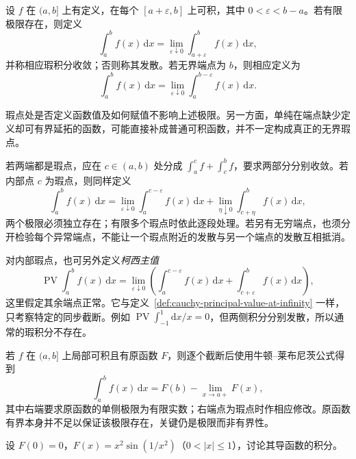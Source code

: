 \documentclass[UTF8,12pt,a4paper,fontset=fandol]{ctexbook}
\begin{document}
\begin{definition}[端点处的瑕积分]
\label{def:singular-integrals-at-endpoints}
设 $f$ 在 $(a,b]$ 上有定义，在每个 $[a+\varepsilon,b]$ 上可积，其中 $0<\varepsilon<b-a$。若有限极限存在，则定义
\begin{equation}
    \int_a^b f(x)\,\mathrm{d}x
    =\lim_{\varepsilon\downarrow0}
        \int_{a+\varepsilon}^b f(x)\,\mathrm{d}x,
    \label{eq:singular-integral-left-endpoint}
\end{equation}
并称相应瑕积分收敛；否则称其发散。若无界端点为 $b$，则相应定义为
\begin{equation}
    \int_a^b f(x)\,\mathrm{d}x
    =\lim_{\varepsilon\downarrow0}
        \int_a^{b-\varepsilon} f(x)\,\mathrm{d}x.
    \label{eq:singular-integral-right-endpoint}
\end{equation}
\end{definition}

瑕点处是否定义函数值及如何赋值不影响上述极限。另一方面，单纯在端点缺少定义却可有界延拓的函数，可能直接补成普通可积函数，并不一定构成真正的无界瑕点。

若两端都是瑕点，应在 $c\in(a,b)$ 处分成 $\int_a^c f+\int_c^b f$，要求两部分分别收敛。若内部点 $c$ 为瑕点，则同样定义
\[
    \int_a^b f(x)\,\mathrm{d}x
    =\lim_{\varepsilon\downarrow0}\int_a^{c-\varepsilon}f(x)\,\mathrm{d}x
     +\lim_{\eta\downarrow0}\int_{c+\eta}^b f(x)\,\mathrm{d}x,
\]
两个极限必须独立存在；有限多个瑕点时依此逐段处理。若另有无穷端点，也须分开检验每个异常端点，不能让一个瑕点附近的发散与另一个端点的发散互相抵消。

对内部瑕点，也可另外定义\emph{柯西主值}
\[
    \operatorname{PV}\int_a^b f(x)\,\mathrm{d}x
    =\lim_{\varepsilon\downarrow0}
       \left(\int_a^{c-\varepsilon}f(x)\,\mathrm{d}x
             +\int_{c+\varepsilon}^b f(x)\,\mathrm{d}x\right),
\]
这里假定其余端点正常。它与定义~\ref{def:cauchy-principal-value-at-infinity} 一样，只考察特定的同步截断。例如 $\operatorname{PV}\int_{-1}^1\mathrm{d}x/x=0$，但两侧积分分别发散，所以通常的瑕积分不存在。

若 $f$ 在 $(a,b]$ 上局部可积且有原函数 $F$，则逐个截断后使用牛顿--莱布尼茨公式得到
\begin{equation}
    \int_a^b f(x)\,\mathrm{d}x
    =F(b)-\lim_{x\to a+}F(x),
    \label{eq:singular-newton-leibniz}
\end{equation}
其中右端要求原函数的单侧极限为有限实数；右端点为瑕点时作相应修改。原函数有界本身并不足以保证该极限存在，关键仍是极限而非有界性。

\begin{example}
\label{ex:unbounded-derivative-singular-integral}
设 $F(0)=0$，$F(x)=x^2\sin(1/x^2)$（$0<|x|\leq1$），讨论其导函数的积分。
\end{example}
\end{document}
